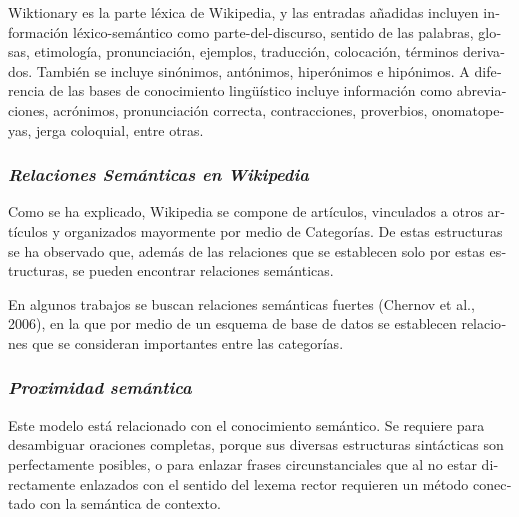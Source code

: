 \documentclass[letterpaper]{article}
\newcommand\textstylebibuscitbase[1]{#1}
\begin{document}
\bigskip

{\sffamily
\textstylebibuscitbase{\foreignlanguage{spanish}{Wiktionary es la parte
l\'exica de Wikipedia, y las entradas a\~nadidas incluyen informaci\'on
l\'exico-sem\'antico como parte-del-discurso, sentido de las palabras,
glosas, etimolog\'ia, pronunciaci\'on, ejemplos, traducci\'on,
colocaci\'on, t\'erminos derivados. Tambi\'en se incluye sin\'onimos,
ant\'onimos, hiper\'onimos e hip\'onimos. A diferencia de las bases de
conocimiento ling\"u\'istico incluye informaci\'on como abreviaciones,
acr\'onimos, pronunciaci\'on correcta, contracciones, proverbios,
onomatopeyas, jerga coloquial, entre otras.}}}


\bigskip

\subsubsection[Relaciones Sem\'anticas en
Wikipedia]{\sffamily\itshape Relaciones
Sem\'anticas en Wikipedia}

\bigskip

{\sffamily
\textstylebibuscitbase{\foreignlanguage{spanish}{Como se ha explicado,
Wikipedia se compone de art\'iculos, vinculados a otros art\'iculos y
organizados mayormente por medio de Categor\'ias. De estas estructuras
se ha observado que, adem\'as de las relaciones que se establecen solo
por estas estructuras, se pueden encontrar relaciones sem\'anticas.}}}


\bigskip

{\sffamily
\textstylebibuscitbase{\foreignlanguage{spanish}{En algunos trabajos se
buscan relaciones sem\'anticas fuertes
}}\textstylebibuscitbase{\foreignlanguage{spanish}{(Chernov et al.,
2006)}}\textstylebibuscitbase{\foreignlanguage{spanish}{, en la que por
medio de un esquema de base de datos se establecen relaciones que se
consideran importantes entre las categor\'ias.}}}


\bigskip

\subsubsection[Proximidad
sem\'antica]{\sffamily\itshape Proximidad
sem\'antica}
\hypertarget{RefHeading10786782078703}{}
\bigskip

{\sffamily
\textstylebibuscitbase{\foreignlanguage{spanish}{Este modelo est\'a
relacionado con el conocimiento sem\'antico. Se requiere para
desambiguar oraciones completas, porque sus diversas estructuras
sint\'acticas son perfectamente posibles, o para enlazar frases
circunstanciales que al no estar directamente enlazados con el sentido
del lexema rector requieren un m\'etodo conectado con la sem\'antica de
contexto. }}}
\end{document}
